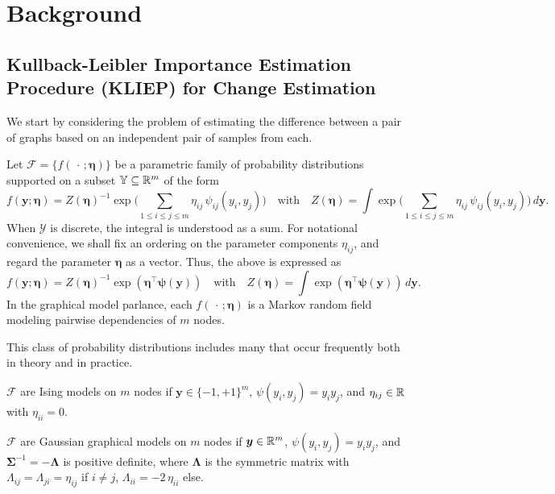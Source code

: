 \documentclass[11pt]{article}
\numberwithin{equation}{section}
\numberwithin{theorem}{section}
\def\faty{\boldsymbol{y}}
\def\fateta{\boldsymbol{\eta}}
\def\fatpsi{\boldsymbol{\psi}}
\def\fatLambda{\boldsymbol{\Lambda}}
\def\fatSigma{\boldsymbol{\Sigma}}
\theoremstyle{definition}
\theoremstyle{remark}
\begin{document}
\section{Background}

\subsection{Kullback-Leibler Importance Estimation Procedure (KLIEP) for Change Estimation} \label{subsec:KLIEP}

We start by considering the problem of estimating the difference between a pair of graphs based on an independent pair of samples from each.

Let $\mathcal{F} = \{f(\,\cdot\,;\fateta)\}$ be a parametric family of probability distributions supported on a subset $\mathbb{Y} \subseteq \mathbb{R}^m$ of the form
\begin{equation}
f(\faty;\fateta)
= Z(\fateta)^{-1} \exp\Big( \sum_{1\leq i\leq j\leq m} \eta_{ij} \, \psi_{ij}(y_i,y_j) \Big)
\quad \text{with} \quad
Z(\fateta) = \int \exp\Big( \sum_{1\leq i\leq j\leq m} \eta_{ij} \, \psi_{ij}(y_i,y_j) \Big) \, d\faty.
\end{equation}
When $\mathcal{Y}$ is discrete, the integral is understood as a sum.
For notational convenience, we shall fix an ordering on the parameter components $\eta_{ij}$, and regard the parameter $\fateta$ as a vector.
Thus, the above is expressed as
\begin{equation}
f(\faty;\fateta)
= Z(\fateta)^{-1} \exp\left( \fateta^\top \fatpsi(\faty) \right)
\quad \text{with} \quad
Z(\fateta) = \int \exp\left( \fateta^\top \fatpsi(\faty) \right) \, d\faty.
\end{equation}
In the graphical model parlance, each $f(\,\cdot\,;\fateta)$ is a Markov random field modeling pairwise dependencies of $m$ nodes.

This class of probability distributions includes many that occur frequently both in theory and in practice.

\begin{example}
$\mathcal{F}$ are Ising models on $m$ nodes if $\faty \in \{-1,+1\}^m$, $\psi(y_i,y_j) = y_iy_j$, and $\eta_{ij} \in \mathbb{R}$ with $\eta_{ii} = 0$.
\end{example}

\begin{example}
$\mathcal{F}$ are Gaussian graphical models on $m$ nodes if $\faty \in \RR^m$, $\psi(y_i,y_j) = y_iy_j$, and $\fatSigma^{-1} = -\fatLambda$ is positive definite, where $\fatLambda$ is the symmetric matrix with $\Lambda_{ij} = \Lambda_{ji} = \eta_{ij}$ if $i \neq j$, $\Lambda_{ii} = -2 \, \eta_{ii}$ else.
\end{example}
\end{document}
